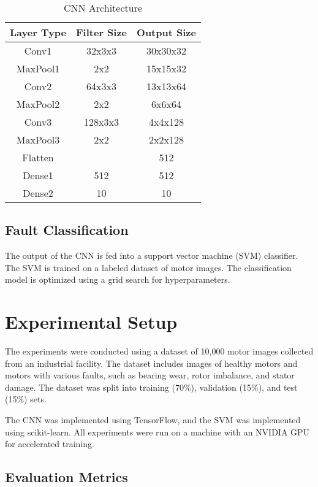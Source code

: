 \documentclass[conference]{IEEEtran}
\begin{document}
\begin{table}[H]
    \caption{CNN Architecture}
    \label{tab:cnn_arch}
    \centering
    \begin{tabular}{|c|c|c|}
        \hline
        Layer Type & Filter Size & Output Size \\
        \hline
        Conv1 & 32x3x3 & 30x30x32 \\
        \hline
        MaxPool1 & 2x2 & 15x15x32 \\
        \hline
        Conv2 & 64x3x3 & 13x13x64 \\
        \hline
        MaxPool2 & 2x2 & 6x6x64 \\
        \hline
        Conv3 & 128x3x3 & 4x4x128 \\
        \hline
        MaxPool3 & 2x2 & 2x2x128 \\
        \hline
        Flatten & & 512 \\
        \hline
        Dense1 & 512 & 512 \\
        \hline
        Dense2 & 10 & 10 \\
        \hline
    \end{tabular}
\end{table}

\subsection{Fault Classification}

The output of the CNN is fed into a support vector machine (SVM) classifier. The SVM is trained on a labeled dataset of motor images. The classification model is optimized using a grid search for hyperparameters.

\section{Experimental Setup}

The experiments were conducted using a dataset of 10,000 motor images collected from an industrial facility. The dataset includes images of healthy motors and motors with various faults, such as bearing wear, rotor imbalance, and stator damage. The dataset was split into training (70\%), validation (15\%), and test (15\%) sets.

The CNN was implemented using TensorFlow, and the SVM was implemented using scikit-learn. All experiments were run on a machine with an NVIDIA GPU for accelerated training.

\subsection{Evaluation Metrics}
\end{document}
